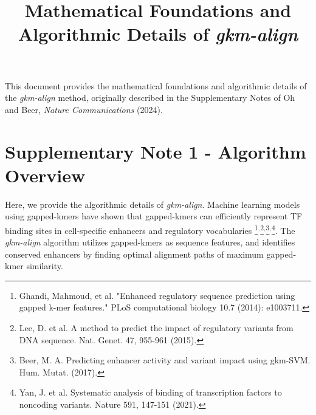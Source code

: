 \documentclass[english]{article}
\title{\textbf{Mathematical Foundations and Algorithmic Details of \textit{gkm-align}}}
\date{}
\begin{document}
\maketitle 

This document provides the mathematical foundations and algorithmic details of the 
\textit{gkm-align} method, originally described in the Supplementary Notes of 
Oh and Beer, \textit{Nature Communications} (2024).

\section{Supplementary Note 1 - Algorithm Overview}

Here, we provide the algorithmic details of \textit{gkm-align}. Machine learning models using gapped-kmers have shown that gapped-kmers can efficiently represent TF binding sites in cell-specific enhancers and regulatory vocabularies \footnote{Ghandi, Mahmoud, et al. "Enhanced regulatory sequence prediction using gapped k-mer features." PLoS computational biology 10.7 (2014): e1003711.}$^{,}$\footnote{Lee, D. et al. A method to predict the impact of regulatory variants from DNA sequence. Nat. Genet. 47, 955-961 (2015).}$^{,}$\footnote{Beer, M. A. Predicting enhancer activity and variant impact using gkm-SVM. Hum. Mutat. (2017).}$^{,}$\footnote{Yan, J. et al. Systematic analysis of binding of transcription factors to noncoding variants. Nature 591, 147-151 (2021).}.
 The \textit{gkm-align} algorithm utilizes gapped-kmers  as sequence features, and identifies conserved enhancers by finding optimal alignment paths of maximum gapped-kmer similarity.
\end{document}
